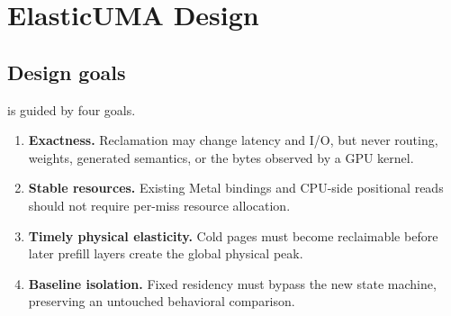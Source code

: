 \section{ElasticUMA Design}
\label{sec:design}

\subsection{Design goals}

\system is guided by four goals.

\begin{enumerate}
  \item \textbf{Exactness.} Reclamation may change latency and I/O, but never
  routing, weights, generated semantics, or the bytes observed by a GPU kernel.
  \item \textbf{Stable resources.} Existing Metal bindings and CPU-side
  positional reads should not require per-miss resource allocation.
  \item \textbf{Timely physical elasticity.} Cold pages must become
  reclaimable before later prefill layers create the global physical peak.
  \item \textbf{Baseline isolation.} Fixed residency must bypass the new state
  machine, preserving an untouched behavioral comparison.
\end{enumerate}

